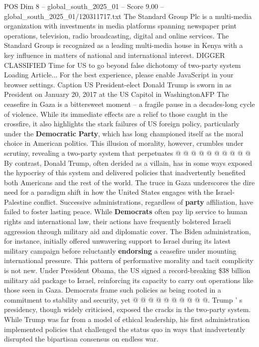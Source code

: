 \begin{textsample}{POS Dim 8 – global\_south\_2025\_01 – Score 9.00 – global\_south\_2025\_01/120311717.txt}  \label{ex:f8_pos_319}
The Standard Group Plc is a multi-media organization with investments in media platforms spanning newspaper print operations, television, radio broadcasting, digital and online services.
The Standard Group is recognized as a leading multi-media house in Kenya with a key influence in matters of national and international interest.
DIGGER CLASSIFIED Time for US to go beyond false dichotomy of two-party system Loading Article...
For the best experience, please enable JavaScript in your browser settings.
Caption US President-elect Donald Trump is sworn in as President on January 20, 2017 at the US Capitol in WashingtonAFP The ceasefire in Gaza is a bittersweet moment -- a fragile pause in a decades-long cycle of violence.
While its immediate effects are a relief to those caught in the crossfire, it also highlights the stark failures of US foreign policy, particularly under the \textbf{Democratic} \textbf{Party}, which has long championed itself as the moral choice in American politics.
This illusion of morality, however, crumbles under scrutiny, revealing a two-party system that perpetuates @ @ @ @ @ @ @ @ @ @ By contrast, Donald Trump, often derided as a villain, has in some ways exposed the hypocrisy of this system and delivered policies that inadvertently benefited both Americans and the rest of the world.
The truce in Gaza underscores the dire need for a paradigm shift in how the United States engages with the Israel-Palestine conflict.
Successive administrations, regardless of \textbf{party} affiliation, have failed to foster lasting peace.
While \textbf{Democrats} often pay lip service to human rights and international law, their actions have frequently bolstered Israeli aggression through military aid and diplomatic cover.
The Biden administration, for instance, initially offered unwavering support to Israel during its latest military campaign before reluctantly \textbf{endorsing} a ceasefire under mounting international pressure.
This pattern of performative morality and tacit complicity is not new.
Under President Obama, the US signed a record-breaking \$38 billion military aid package to Israel, reinforcing its capacity to carry out operations like those seen in Gaza.
Democrats frame such policies as being rooted in a commitment to stability and security, yet @ @ @ @ @ @ @ @ @ @.
Trump ' s presidency, though widely criticised, exposed the cracks in the two-party system.
While Trump was far from a model of ethical leadership, his first administration implemented policies that challenged the status quo in ways that inadvertently disrupted the bipartisan consensus on endless war.

\end{textsample}
